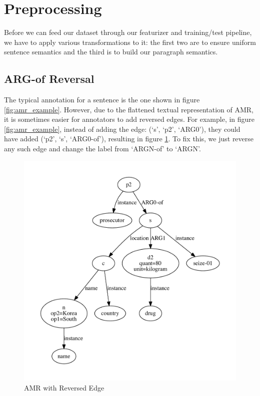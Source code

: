 \documentclass[12pt]{article}
\begin{document}
\section{Preprocessing}
Before we can feed our dataset through our featurizer and training/test pipeline, we have to apply various transformations to it: the first two are to ensure uniform sentence semantics and the third is to build our paragraph semantics.

\subsection{ARG-of Reversal}
The typical annotation for a sentence is the one shown in figure \ref{fig:amr_example}. However, due to the flattened textual representation of AMR, it is sometimes easier for annotators to add reversed edges. For example, in figure \ref{fig:amr_example}, instead of adding the edge: (`s', `p2', `ARG0'), they could have added (`p2', `s', `ARG0-of'), resulting in figure \ref{fig:amr_example_argof}. To fix this, we just reverse any such edge and change the label from `ARGN-of' to `ARGN'.

\begin{figure}
\includegraphics[width=\linewidth]{amr_example_argof.pdf}
\caption{AMR with Reversed Edge}
\label{fig:amr_example_argof}
\end{figure}
\end{document}
